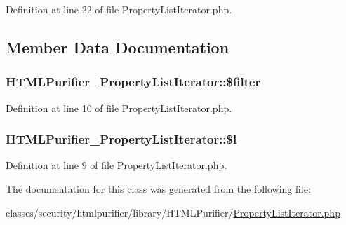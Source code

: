 Definition at line 22 of file Property\+List\+Iterator.\+php.



\subsection{Member Data Documentation}
\hypertarget{classHTMLPurifier__PropertyListIterator_a149602e661a7924b45179aab9147f15c}{
\subsubsection[{\$filter}]{\setlength{\rightskip}{0pt plus 5cm}H\+T\+M\+L\+Purifier\+\_\+\+Property\+List\+Iterator\+::\$filter\hspace{0.3cm}{\ttfamily [protected]}}}\label{classHTMLPurifier__PropertyListIterator_a149602e661a7924b45179aab9147f15c}


Definition at line 10 of file Property\+List\+Iterator.\+php.

\hypertarget{classHTMLPurifier__PropertyListIterator_a27292e22d81f619f1fc0396fd5445004}{
\subsubsection[{\$l}]{\setlength{\rightskip}{0pt plus 5cm}H\+T\+M\+L\+Purifier\+\_\+\+Property\+List\+Iterator\+::\$l\hspace{0.3cm}{\ttfamily [protected]}}}\label{classHTMLPurifier__PropertyListIterator_a27292e22d81f619f1fc0396fd5445004}


Definition at line 9 of file Property\+List\+Iterator.\+php.



The documentation for this class was generated from the following file\+:\begin{DoxyCompactItemize}
\item 
classes/security/htmlpurifier/library/\+H\+T\+M\+L\+Purifier/\hyperlink{PropertyListIterator_8php}{Property\+List\+Iterator.\+php}\end{DoxyCompactItemize}

